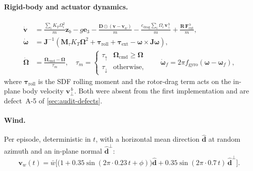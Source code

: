 \documentclass[11pt,a4paper,twoside,openright]{report}
\makeatletter
\renewcommand{\subsection}{\FloatBarrier\old@subsection}}
\renewcommand{\vec}[1]{\bm{#1}}
\newcommand{\mat}[1]{\bm{#1}}
\newcommand{\bodyrate}{\vec{\omega}}
\theoremstyle{plain}
\theoremstyle{definition}
\theoremstyle{remark}
\DeclareRobustCommand{\nbd}{\mbox{-}}
\makeatother
\begin{document}
	\paragraph{Rigid-body and actuator dynamics.}
	\begin{align}
		\dot{\vec v} &= \frac{\sum_i K_T\Omega_i^2}{m}\vec z_b-g\vec e_3
		-\frac{\vec D\odot(\vec v-\vec v_w)}{m}
		-\frac{c_\mathrm{drag}\sum_i\Omega_i\,\vec v_\perp^{\,b}}{m}
		+\frac{\mat R\,\vec F_\mathrm{ext}^{\,b}}{m},
		\label{eq:fp-trans}\\
		\dot{\bodyrate} &= \mat J^{-1}\!\left(
		\mat M_\tau K_T\vec\Omega^2+\vec\tau_\mathrm{roll}+\vec\tau_\mathrm{ext}
		-\bodyrate\times\mat J\bodyrate\right),
		\label{eq:fp-rot}\\
		\dot{\vec\Omega} &= \frac{\vec\Omega_\mathrm{cmd}-\vec\Omega}{\tau_m},\quad
		\tau_m=\begin{cases}\tau_\uparrow & \vec\Omega_\mathrm{cmd}\ge\vec\Omega\\
			\tau_\downarrow & \text{otherwise,}\end{cases}
		\qquad
		\dot{\bodyrate}_f = 2\pi f_\mathrm{gyro}(\bodyrate-\bodyrate_f),
		\label{eq:fp-act}
	\end{align}
	where $\vec\tau_\mathrm{roll}$ is the SDF rolling moment and the rotor-drag term
	acts on the in-plane body velocity $\vec v_\perp^{\,b}$. Both were absent from
	the first implementation and are defect~A\nbd 5 of
	\cref{sec:audit-defects}.

	\paragraph{Wind.} Per episode, deterministic in $t$, with a horizontal mean
	direction $\hat{\vec d}$ at random azimuth and an in-plane normal
	$\hat{\vec d}^{\perp}$:
	\begin{equation}
		\vec v_w(t)=\bar w\Big[\big(1+0.35\sin(2\pi\cdot0.23\,t+\phi)\big)\hat{\vec d}
		+0.35\sin(2\pi\cdot0.7\,t)\,\hat{\vec d}^{\perp}\Big].
		\label{eq:wind}
	\end{equation}

	\subsection{Payload model}
\end{document}
